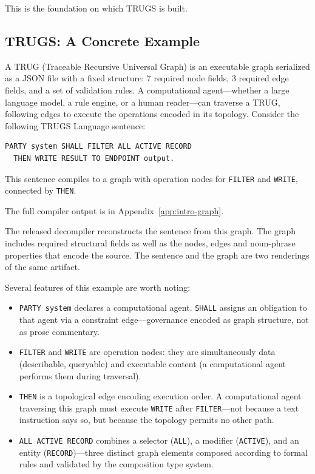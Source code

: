 \documentclass{article}
\begin{document}
This is the foundation on which TRUGS is built.

\subsection{TRUGS: A Concrete Example}

A TRUG (Traceable Recursive Universal Graph) is an executable graph serialized as a JSON file with a fixed structure: 7 required node fields, 3 required edge fields, and a set of validation rules. A computational agent---whether a large language model, a rule engine, or a human reader---can traverse a TRUG, following edges to execute the operations encoded in its topology. Consider the following TRUGS Language sentence:

\begin{lstlisting}[style=trugs]
PARTY system SHALL FILTER ALL ACTIVE RECORD
  THEN WRITE RESULT TO ENDPOINT output.
\end{lstlisting}

This sentence compiles to a graph with operation nodes for \texttt{FILTER} and \texttt{WRITE}, connected by \texttt{THEN}.

The full compiler output is in Appendix~\ref{app:intro-graph}.

The released decompiler reconstructs the sentence from this graph. The graph includes required structural fields as well as the nodes, edges and noun-phrase properties that encode the source. The sentence and the graph are two renderings of the same artifact.

Several features of this example are worth noting:

\begin{itemize}
    \item \texttt{PARTY system} declares a computational agent. \texttt{SHALL} assigns an obligation to that agent via a constraint edge---governance encoded as graph structure, not as prose commentary.
    \item \texttt{FILTER} and \texttt{WRITE} are operation nodes: they are simultaneously data (describable, queryable) and executable content (a computational agent performs them during traversal).
    \item \texttt{THEN} is a topological edge encoding execution order. A computational agent traversing this graph must execute \texttt{WRITE} after \texttt{FILTER}---not because a text instruction says so, but because the topology permits no other path.
    \item \texttt{ALL ACTIVE RECORD} combines a selector (\texttt{ALL}), a modifier (\texttt{ACTIVE}), and an entity (\texttt{RECORD})---three distinct graph elements composed according to formal rules and validated by the composition type system.
\end{itemize}
\end{document}

